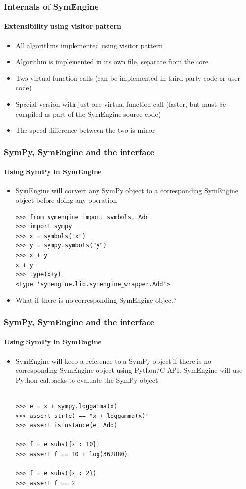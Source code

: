 \documentclass{beamer}
\begin{document}
\begin{frame}
\frametitle{Internals of SymEngine}
\framesubtitle{Extensibility using visitor pattern}
\begin{itemize}
    \item All algorithms implemented using visitor pattern
    \item Algorithm is implemented in its own file, separate from the core
    \item Two virtual function calls (can be implemented in third party code or
        user code)
    \item Special version with just one virtual function call (faster, but must
        be compiled as part of the SymEngine source code)
    \item The speed difference between the two is minor
\end{itemize}
\end{frame}


\begin{frame}[fragile]
\frametitle{SymPy, SymEngine and the interface}
\framesubtitle{Using SymPy in SymEngine}
\begin{itemize}
\item
SymEngine will convert any SymPy object to a corresponding SymEngine object before doing any operation

\begin{verbatim}
>>> from symengine import symbols, Add
>>> import sympy
>>> x = symbols("x")
>>> y = sympy.symbols("y")
>>> x + y
x + y
>>> type(x+y)
<type 'symengine.lib.symengine_wrapper.Add'>
\end{verbatim}
\item
What if there is no corresponding SymEngine object?
\end{itemize}
\end{frame}


\begin{frame}[fragile]
\frametitle{SymPy, SymEngine and the interface}
\framesubtitle{Using SymPy in SymEngine}
\begin{itemize}
\item
SymEngine will keep a reference to a SymPy object if there is no corresponding SymEngine object using Python/C API.
SymEngine will use Python callbacks to evaluate the SymPy object

\begin{verbatim}

>>> e = x + sympy.loggamma(x)
>>> assert str(e) == "x + loggamma(x)"
>>> assert isinstance(e, Add)

>>> f = e.subs({x : 10})
>>> assert f == 10 + log(362880)

>>> f = e.subs({x : 2})
>>> assert f == 2
\end{verbatim}
\end{itemize}
\end{frame}
\end{document}
